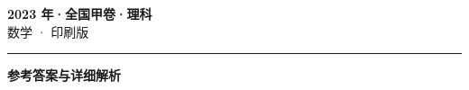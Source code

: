 \documentclass[zihao=5, a4paper]{ctexart}
\begin{document}
\begin{center}
  {\Large\bfseries 2023 年·全国甲卷·理科}\\[4pt]
  {\large 数学 · 印刷版}
\end{center}
\medskip
{}

\par\bigskip\hrule\bigskip
{}
\begin{center}{\large\bfseries 参考答案与详细解析}\end{center}
\smallskip

\end{document}
